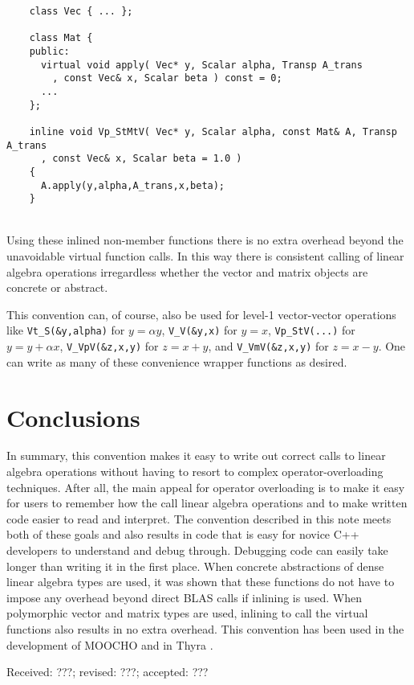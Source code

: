 \documentclass[acmtoms,acmnow]{acmtrans2m}
\begin{document}
{\bsinglespace\small
\begin{minipage}{\textwidth}
\begin{verbatim}
    class Vec { ... };

    class Mat {
    public:
      virtual void apply( Vec* y, Scalar alpha, Transp A_trans
        , const Vec& x, Scalar beta ) const = 0;
      ...
    };

    inline void Vp_StMtV( Vec* y, Scalar alpha, const Mat& A, Transp A_trans
      , const Vec& x, Scalar beta = 1.0 )
    {
      A.apply(y,alpha,A_trans,x,beta);
    }
\end{verbatim}
\end{minipage}
\esinglespace}\\[1ex]

Using these inlined non-member functions there is no extra overhead beyond the
unavoidable virtual function calls.  In this way there is consistent calling
of linear algebra operations irregardless whether the vector and matrix
objects are concrete or abstract.

This convention can, of course, also be used for level-1 vector-vector
operations like {}\texttt{Vt\_S(\&y,alpha)} for $y = \alpha y$,
{}\texttt{V\_V(\&y,x)} for $y = x$, {}\texttt{Vp\_StV(...)} for $y = y +
\alpha x$, {}\texttt{V\_VpV(\&z,x,y)} for $z = x + y$, and
{}\texttt{V\_VmV(\&z,x,y)} for $z = x - y$.  One can write as many of these
convenience wrapper functions as desired.

\section{Conclusions}

In summary, this convention makes it easy to write out correct calls to linear
algebra operations without having to resort to complex operator-overloading
techniques.  After all, the main appeal for operator overloading is to make it
easy for users to remember how the call linear algebra operations and to make
written code easier to read and interpret.  The convention described in this
note meets both of these goals and also results in code that is easy for
novice C++ developers to understand and debug through.  Debugging code can
easily take longer than writing it in the first place.  When concrete
abstractions of dense linear algebra types are used, it was shown that these
functions do not have to impose any overhead beyond direct BLAS calls if
inlining is used.  When polymorphic vector and matrix types are used, inlining
to call the virtual functions also results in no extra overhead.  This
convention has been used in the development of MOOCHO {}\cite{ref:moocho} and
in Thyra {}\cite{ref:thyra}.

{\bsinglespace

\nopagebreak
\scriptsize

\esinglespace}

\begin{received}
Received: ???; revised: ???; accepted: ???
\end{received}
\end{document}
